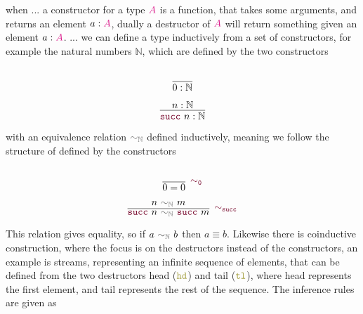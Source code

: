 \documentclass[twoside,11pt,openright]{report}
\theoremstyle{plain} %
\theoremstyle{definition}
\theoremstyle{remark}
\newcommand*{\type}[1]{\textcolor{magenta!90!black}{#1}}
\newcommand*{\relation}[1]{\textcolor{gray!75!black}{\ensuremath{\mathtt{#1}}}}
\newcommand*{\constructor}[1]{\textcolor{purple!60!black}{\ensuremath{\mathtt{#1}}}}
\newcommand*{\destructor}[1]{\textcolor{yellow!60!black}{\ensuremath{\mathtt{#1}}}}
\begin{document}
when ... a constructor for a type \(\type{A}\) is a function, that takes some arguments, and returns an element \(a : \type{A}\), dually a destructor of \(\type{A}\) will return something given an element \(a : \type{A}\). ... we can define a type inductively from a set of constructors, for example the natural numbers \(\mathbb{N}\), which are defined by the two constructors
\begin{center}
  \strut
  \hfill
  \begin{minipage}{0.15\linewidth}
    \begin{equation}
      \vcenter{\infer{0 : \mathbb{N}}{\strut}}
    \end{equation}
  \end{minipage}
  \hfill
  \begin{minipage}{0.20\linewidth}
    \begin{equation}
      \vcenter{\infer{\constructor{succ}~n : \mathbb{N}}{n : \mathbb{N}}}
    \end{equation}
  \end{minipage}
  \hfill
  \strut
\end{center}
with an equivalence relation \(\relation{\sim_{\mathbb{N}}}\) defined inductively, meaning we follow the structure of defined by the constructors
\begin{center}
  \strut
  \hfill
  \begin{minipage}{0.20\linewidth}
    \begin{equation}
      \vcenter{\infer[\constructor{\sim_{0}}]{0 = 0}{\strut}}
    \end{equation}
  \end{minipage}
  \hfill
  \begin{minipage}{0.35\linewidth}
    \begin{equation}
      \vcenter{\infer[\constructor{\sim_{succ}}]{\constructor{succ}~n~\relation{\sim_{\mathbb{N}}}~\constructor{succ}~m}{n~\relation{\sim_{\mathbb{N}}}~m}}
    \end{equation}
  \end{minipage}
  \hfill
  \strut
\end{center}
This relation gives equality, so if \(a~\relation{\sim_{\mathbb{N}}}~b\) then \(a \equiv b\). Likewise there is coinductive construction, where the focus is on the destructors instead of the constructors, an example is streams, representing an infinite sequence of elements, that can be defined from the two destructors head (\(\destructor{hd}\)) and tail (\(\destructor{tl}\)), where head represents the first element, and tail represents the rest of the sequence. The inference rules are given as
\end{document}

